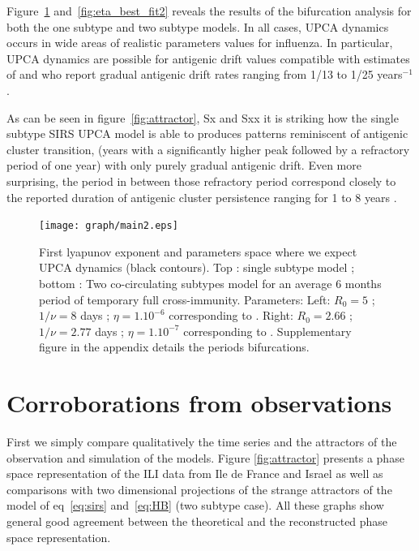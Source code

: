 \documentclass[12pt]{article}
\begin{document}
Figure~\ref{fig:main2} and~\ref{fig:eta_best_fit2} reveals the results
of the bifurcation analysis for both the one subtype and two subtype
models. In all cases, UPCA dynamics occurs in wide areas of realistic
parameters values for influenza. In particular, UPCA dynamics are
possible for antigenic drift values compatible with estimates of
\citet{Finkenstaedt2005} and \citep{Pease1987} who report gradual
antigenic drift rates ranging from 1/13 to 1/25 years$^{-1}$.

As can be seen in figure~\ref{fig:attractor}, Sx and Sxx it is
striking how the single subtype SIRS UPCA model is able to produces
patterns reminiscent of antigenic cluster transition, (years with a
significantly higher peak followed by a refractory period of one year)
with only purely gradual antigenic drift. Even more surprising, the
period in between those refractory period correspond closely to the
reported duration of antigenic cluster persistence ranging for 1 to 8
years \citep{Smith2004}.


\begin{figure}[htb]
  \center
  \texttt{[image: graph/main2.eps]}
  \caption{First lyapunov exponent and parameters space where we
    expect UPCA dynamics (black contours). Top : single subtype model
    ; bottom : Two co-circulating subtypes model for an average 6
    months period of temporary full cross-immunity.  Parameters: Left:
    $R_0=5$ ; $1/\nu=8$ days ; $\eta=1.10^{-6}$ corresponding to
    \citep{Koelle2006}. Right: $R_0=2.66$ ; $1/\nu=2.77$ days ;
    $\eta=1.10^{-7}$ corresponding to
    \citep{Lavenu2004}. Supplementary figure in the appendix details
    the periods bifurcations.}
  \label{fig:main2}
\end{figure}


\section{Corroborations from observations}
\label{sec:confirmation}

First we simply compare qualitatively the time series and the
attractors of the observation and simulation of the models. Figure
\ref{fig:attractor} presents a phase space representation of the ILI
data from Ile de France and Israel as well as comparisons with two
dimensional projections of the strange attractors of the model of
eq~\eqref{eq:sirs} and~\eqref{eq:HB} (two subtype case). All these
graphs show general good agreement between the theoretical and the
reconstructed phase space representation.
\end{document}
